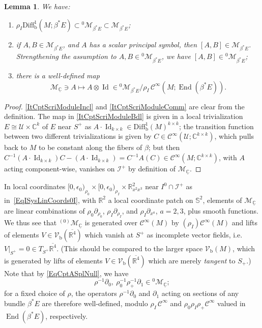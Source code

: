 \documentclass[reqno,11pt,letterpaper]{amsart}
\numberwithin{equation}{section}
\numberwithin{figure}{section}
\newtheorem{lemma}[thm]{Lemma}
\theoremstyle{definition}
\theoremstyle{remark}
\newcommand{\mc}{\mathcal}
\newcommand{\cC}{\mc C}
\newcommand{\cM}{\mc M}
\newcommand{\cU}{\mc U}
\newcommand{\ms}{\mathscr}
\newcommand{\scri}{\ms I}
\newcommand{\C}{\mathbb{C}}
\newcommand{\R}{\mathbb{R}}
\newcommand{\Sph}{\mathbb{S}}
\newcommand{\End}{\operatorname{End}}
\newcommand{\Id}{\operatorname{Id}}
\newcommand{\eps}{\epsilon}
\newcommand{\ol}{\overline}
\newcommand{\pa}{\partial}
\newcommand{\ul}[1]{\underline{#1}{}}
\newcommand{\bop}{{\mathrm{b}}}
\newcommand{\Diff}{\mathrm{Diff}}
\newcommand{\Vf}{\mathcal V}
\newcommand{\Vb}{\Vf_\bop}
\newcommand{\Diffb}{\Diff_\bop}
\newcommand{\CI}{\cC^\infty}
\begin{document}
\begin{lemma}
\label{LemmaCptScriModule}
  We have:
  \begin{enumerate}
  \item\label{ItCptScriModuleIncl} $\rho_I\Diffb^1(M;\beta^*E)\subset{}^0\cM_{\beta^*E}\subset\cM_{\beta^*E}$;
  \item\label{ItCptScriModuleComm} if $A,B\in\cM_{\beta^*E}$, and $A$ has a scalar principal symbol, then $[A,B]\in\cM_{\beta^*E}$. Strengthening the assumption to $A,B\in{}^0\cM_{\beta^*E}$, we have $[A,B]\in{}^0\cM_{\beta^*E}$;
  \item\label{ItCptScriModuleBdl} there is a well-defined map
     \[
       \cM_{\ul\C}\ni A\mapsto A\otimes\Id\in{}^0\cM_{\beta^*E}/\rho_I\,\CI(M;\End(\beta^*E)).
     \]
  \end{enumerate}
\end{lemma}
\begin{proof}
  \eqref{ItCptScriModuleIncl} and \eqref{ItCptScriModuleComm} are clear from the definition. The map in \eqref{ItCptScriModuleBdl} is given in a local trivialization $E\cong\cU\times\C^k$ of $E$ near $S^+$ as $A\cdot\Id_{k\times k}\in\Diffb^1(M)^{k\times k}$; the transition function between two different trivializations is given by $C\in\CI(\cU;\C^{k\times k})$, which pulls back to $M$ to be constant along the fibers of $\beta$; but then $C^{-1}(A\cdot\Id_{k\times k})C-(A\cdot\Id_{k\times k})=C^{-1}A(C)\in\CI(M;\C^{k\times k})$, with $A$ acting component-wise, vanishes on $\scri^+$ by definition of $\cM_{\ul\C}$.
\end{proof}

In local coordinates $[0,\eps_0)_{\rho_0}\times[0,\eps_0)_{\rho_I}\times\R_{x^2 x^3}^2$ near $I^0\cap\scri^+$ as in~\eqref{EqISysLinCoords0I}, with $\R^2$ a local coordinate patch on $\Sph^2$, elements of $\cM_{\ul\C}$ are linear combinations of $\rho_0\pa_{\rho_0}$, $\rho_I\pa_{\rho_I}$, and $\rho_I\pa_{x^a}$, $a=2,3$, plus smooth functions. We thus see that ${}^{(0)}\cM_{\ul\C}$ is generated over $\CI(M)$ by $(\rho_I)\CI(M)$ and lifts of elements $V\in\Vb(\ol{\R^4})$ which vanish at $S^+$ as incomplete vector fields, i.e.\ $V|_{S^+}=0\in T_{S^+}\ol{\R^4}$. (This should be compared to the larger space $\Vb(M)$, which is generated by lifts of elements $V\in\Vb(\ol{\R^4})$ which are merely \emph{tangent} to $S_+$.) Note that by \eqref{EqCptASplNull}, we have
\begin{equation}
\label{EqCptScriNull}
  \rho^{-1}\pa_0,\ \rho_0^{-1}\rho_+^{-1}\pa_1 \in {}^0\cM_{\ul\C};
\end{equation}
for a fixed choice of $\rho$, the operators $\rho^{-1}\pa_0$ and $\pa_1$ acting on sections of any bundle $\beta^*E$ are therefore well-defined, modulo $\rho_I\,\CI$ and $\rho_0\rho_I\rho_+\CI$ valued in $\End(\beta^*E)$, respectively.
\end{document}
